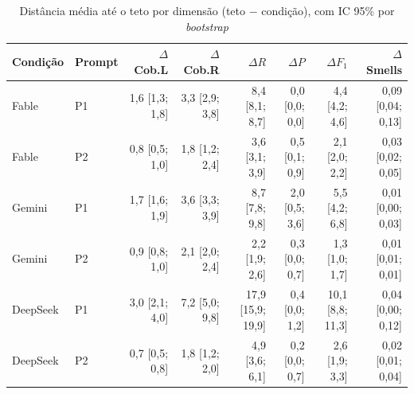 \begin{table}[htb]
    \centering
    \ABNTEXfontereduzida
    \begin{minipage}{\textwidth}
        \caption{Distância média até o teto por dimensão (teto $-$ condição), com IC 95\% por \textit{bootstrap}}
        \label{tab:gaps}
        \centering\scriptsize\setlength{\tabcolsep}{3pt}
        \begin{tabular}{ll rrrrrr}
            \toprule
            \textbf{Condição} & \textbf{Prompt} & $\Delta$Cob.L & $\Delta$Cob.R & $\Delta R$ & $\Delta P$ & $\Delta F_1$ & $\Delta$Smells \\
            \midrule
            Fable & P1 & 1,6 [1,3; 1,8] & 3,3 [2,9; 3,8] & 8,4 [8,1; 8,7] & 0,0 [0,0; 0,0] & 4,4 [4,2; 4,6] & 0,09 [0,04; 0,13] \\
            Fable & P2 & 0,8 [0,5; 1,0] & 1,8 [1,2; 2,4] & 3,6 [3,1; 3,9] & 0,5 [0,1; 0,9] & 2,1 [2,0; 2,2] & 0,03 [0,02; 0,05] \\
            Gemini & P1 & 1,7 [1,6; 1,9] & 3,6 [3,3; 3,9] & 8,7 [7,8; 9,8] & 2,0 [0,5; 3,6] & 5,5 [4,2; 6,8] & 0,01 [0,00; 0,03] \\
            Gemini & P2 & 0,9 [0,8; 1,0] & 2,1 [2,0; 2,4] & 2,2 [1,9; 2,6] & 0,3 [0,0; 0,7] & 1,3 [1,0; 1,7] & 0,01 [0,01; 0,01] \\
            DeepSeek & P1 & 3,0 [2,1; 4,0] & 7,2 [5,0; 9,8] & 17,9 [15,9; 19,9] & 0,4 [0,0; 1,2] & 10,1 [8,8; 11,3] & 0,04 [0,00; 0,12] \\
            DeepSeek & P2 & 0,7 [0,5; 0,8] & 1,8 [1,2; 2,0] & 4,9 [3,6; 6,1] & 0,2 [0,0; 0,7] & 2,6 [1,9; 3,3] & 0,02 [0,01; 0,04] \\
            \bottomrule
        \end{tabular}
    \end{minipage}
\end{table}
